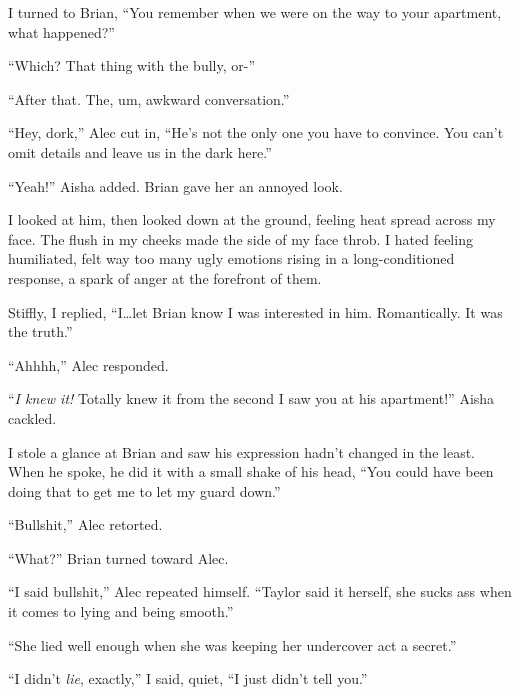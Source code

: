 I turned to Brian, ``You remember when we were on the way to your apartment, what happened?''



``Which?  That thing with the bully, or-''



``After that.  The, um, awkward conversation.''



``Hey, dork,'' Alec cut in, ``He's not the only one you have to convince.  You can't omit details and leave us in the dark here.''



``Yeah!'' Aisha added.  Brian gave her an annoyed look.



I looked at him, then looked down at the ground, feeling heat spread across my face.  The flush in my cheeks made the side of my face throb.  I hated feeling humiliated, felt way too many ugly emotions rising in a long-conditioned response, a spark of anger at the forefront of them.



Stiffly, I replied, ``I\ldots let Brian know I was interested in him.  Romantically.  It was the truth.''



``Ahhhh,'' Alec responded.



``\emph{I knew it!}  Totally knew it from the second I saw you at his apartment!''  Aisha cackled.



I stole a glance at Brian and saw his expression hadn't changed in the least.  When he spoke, he did it with a small shake of his head, ``You could have been doing that to get me to let my guard down.''



``Bullshit,'' Alec retorted.



``What?'' Brian turned toward Alec.



``I said bullshit,'' Alec repeated himself.  ``Taylor said it herself, she sucks ass when it comes to lying and being smooth.''



``She lied well enough when she was keeping her undercover act a secret.''



``I didn't \emph{lie}, exactly,'' I said, quiet, ``I just didn't tell you.''



